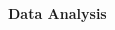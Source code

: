 \documentclass[11pt]{article}
\begin{document}
\begin{multicols}{2}

    

    \vspace{10pt}

     \selectfont \textbf{Data Analysis}
    
     \selectfont 
    




\end{multicols}
\end{document}
